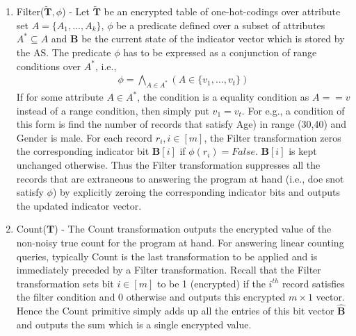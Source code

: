 \begin{enumerate}
  \item \textsf{Filter}($\tilde{\mathbf{T}},\phi$) - Let $\tilde{\mathbf{T}}$ be an encrypted table of one-hot-codings over attribute set $A=\{A_1,...,A_k\}$, $\phi$ be a  predicate defined over a subset of attributes $A^*\subseteq A$ and $\mathbf{B}$ be the current state of the indicator vector which is stored by the \textsf{AS}. The predicate $\phi$ has to be expressed as a conjunction of range conditions over $A^*$, i.e.,\begin{gather}\phi = \bigwedge_{A \in A^*}(A \in \{v_{1},\ldots,v_{t}\} ) \label{phi} \end{gather} If for some attribute $A \in A^*$, the condition is a equality condition as $A==v$ instead of a range condition, then simply put $v_1=v_t$. For e.g., a condition of this form is find the number of records that satisfy \textsf{Age}) in range (30,40) and \textsf{Gender} is male. For each record $r_i, i \in [m]$, the Filter transformation zeros the corresponding indicator bit $\mathbf{B}[i] $ if $\phi(r_i)=False$. $\mathbf{B}[i] $ is kept unchanged otherwise. Thus the \textsf{Filter} transformation suppresses all the records that are extraneous to answering the program at hand (i.e., doe snot satisfy $\phi$) by explicitly zeroing the corresponding indicator bits and outputs the updated indicator vector. %
    \item{\textsf{Count}($\mathbf{T}$) } - The \textsf{Count} transformation outputs the encrypted value of the non-noisy true count for the program at hand. For answering linear counting queries, typically \textsf{Count}  is the last transformation to be applied and is immediately preceded by a \textsf{Filter} transformation. Recall that the \textsf{Filter} transformation sets bit $i \in [m]$ to be 1 (encrypted) if the $i^{th}$ record satisfies the filter condition and 0 otherwise and outputs this encrypted $m\times 1$ vector. Hence the \textsf{Count} primitive simply adds up all the entries of this bit vector $\hat{\mathbf{B}}$ and  outputs the sum which is a single encrypted value. 

\end{enumerate}
